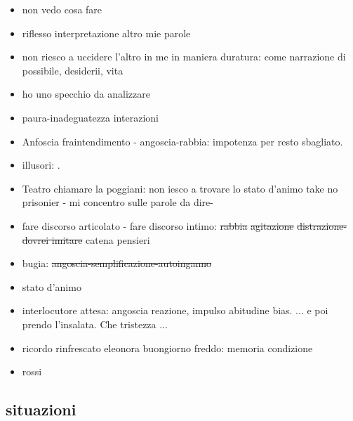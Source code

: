 \begin{itemize}
\item non vedo cosa fare
\item riflesso interpretazione altro mie parole
\item non riesco a uccidere l'altro in me in maniera duratura: come narrazione di possibile, desiderii, vita
\item ho uno specchio da analizzare
\item paura-inadeguatezza interazioni
\item Anfoscia fraintendimento - angoscia-rabbia: impotenza per resto sbagliato.
\item {} illusori: .
\item Teatro chiamare la poggiani: non iesco a trovare lo stato d'animo take no prisonier - mi concentro sulle parole da dire- 
\item fare discorso articolato - fare discorso intimo: \sout{rabbia} \sout{agitazione} \sout{distrazione-dovrei imitare} catena pensieri
\item bugia: \sout{angoscia-semplificazione-autoinganno} 
\item stato d'animo 
\item interlocutore attesa: angoscia reazione, impulso abitudine bias. ... e poi prendo l'insalata. Che tristezza ...
\item ricordo rinfrescato eleonora buongiorno freddo: memoria condizione 
\item {} rossi
\end{itemize}

\subsection{situazioni}

